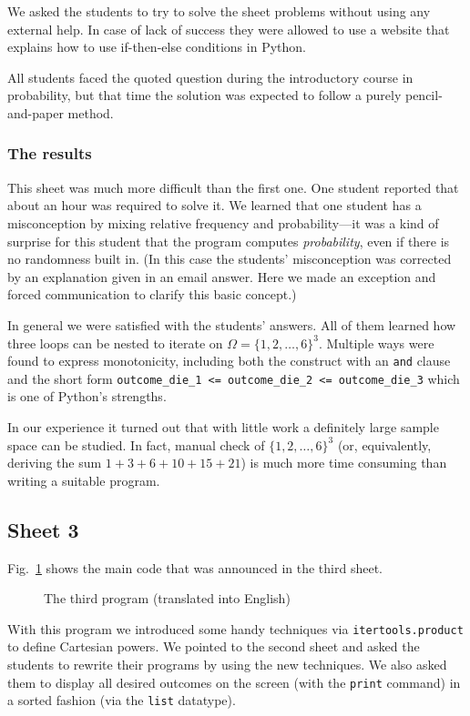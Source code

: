 \documentclass[]{interact}
\theoremstyle{plain}%
\theoremstyle{definition}
\theoremstyle{remark}
\begin{document}
We asked the students to try to solve the sheet problems without using any external help.
In case of lack of success
they were allowed to use a website that explains how to use if-then-else conditions in Python.

All students faced the quoted question during the introductory course in probability, but that time the solution
was expected to follow a purely pencil-and-paper method.

\subsubsection*{The results}

This sheet was much more difficult than the first one. One student reported that about an hour was required to solve it.
We learned that one student has a misconception by mixing relative frequency and probability---it was
a kind of surprise for this student that the program computes \textit{probability}, even if
there is no randomness built in. (In this case the students' misconception was corrected
by an explanation given in an email answer. Here we made an exception and forced
communication to clarify this basic concept.)

In general we were satisfied with the students' answers. All of them learned how three loops can
be nested to iterate on $\Omega=\{1,2,\ldots,6\}^3$. Multiple ways were found to express monotonicity,
including both the construct with an \texttt{and} clause and the short form
\texttt{outcome\_die\_1 <= outcome\_die\_2 <= outcome\_die\_3} which is one of Python's strengths.

In our experience it turned out that with little work a definitely large sample space
can be studied. In fact, manual check of $\{1,2,\ldots,6\}^3$ (or, equivalently, deriving the sum
$1+3+6+10+15+21$) is much more time consuming than writing a suitable program.

\subsection*{Sheet 3}

Fig.~\ref{3.py} shows the main code that was announced in the third sheet.

\begin{figure}

\caption{The third program (translated into English)}
\label{3.py}
\end{figure}

With this program we introduced some handy techniques via \texttt{itertools.product}
to define Cartesian powers. We pointed to
the second sheet and asked the students to rewrite their programs by using the new techniques.
We also asked them to display all desired outcomes on the screen (with the \texttt{print} command)
in a sorted fashion (via the \texttt{list} datatype).
\end{document}
